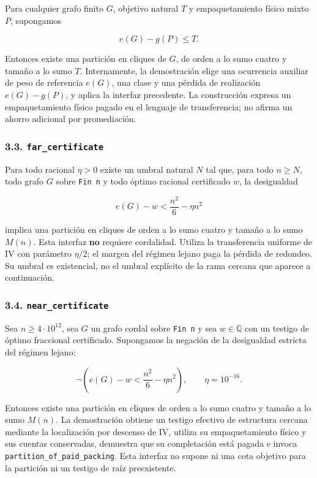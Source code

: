 \documentclass[spanish,11pt,a4paper]{article}
\begin{document}
Para cualquier grafo finito \(G\), objetivo natural \(T\) y
empaquetamiento físico mixto \(P\), supongamos

\[
e(G)-g(P)\le T.
\]

Entonces existe una partición en cliques de \(G\), de orden a lo sumo
cuatro y tamaño a lo sumo \(T\). Internamente, la demostración elige una
ocurrencia auxiliar de peso de referencia \(e(G)\), una clase y una
pérdida de realización \(e(G)-g(P)\), y aplica la interfaz precedente.
La construcción expresa un empaquetamiento físico pagado en el lenguaje
de transferencia; no afirma un ahorro adicional por promediación.

\subsubsection{\texorpdfstring{3.3.
\nolinkurl{far_certificate}}{3.3. far\_certificate}}\label{far_certificate}

Para todo racional \(\eta>0\) existe un umbral natural \(N\) tal que,
para todo \(n\ge N\), todo grafo \(G\) sobre \texttt{Fin\ n} y todo
óptimo racional certificado \(w\), la desigualdad

\[
e(G)-w<\frac{n^2}{6}-\eta n^2
\]

implica una partición en cliques de orden a lo sumo cuatro y tamaño a lo
sumo \(M(n)\). Esta interfaz \textbf{no} requiere cordalidad. Utiliza la
transferencia uniforme de IV con parámetro \(\eta/2\); el margen del
régimen lejano paga la pérdida de redondeo. Su umbral es existencial, no
el umbral explícito de la rama cercana que aparece a continuación.

\subsubsection{\texorpdfstring{3.4.
\nolinkurl{near_certificate}}{3.4. near\_certificate}}\label{near_certificate}

Sea \(n\ge4\cdot10^{12}\), sea \(G\) un grafo cordal sobre
\texttt{Fin\ n} y sea \(w\in\mathbb Q\) con un testigo de óptimo
fraccional certificado. Supongamos la negación de la desigualdad
estricta del régimen lejano:

\[
\neg\left(e(G)-w<\frac{n^2}{6}-\eta n^2\right),
\qquad \eta=10^{-16}.
\]

Entonces existe una partición en cliques de orden a lo sumo cuatro y
tamaño a lo sumo \(M(n)\). La demostración obtiene un testigo efectivo
de estructura cercana mediante la localización por descenso de IV,
utiliza su empaquetamiento físico y sus cuentas conservadas, demuestra
que su completación está pagada e invoca
\nolinkurl{partition_of_paid_packing}. Esta interfaz no supone ni una
cota objetivo para la partición ni un testigo de raíz preexistente.
\end{document}
